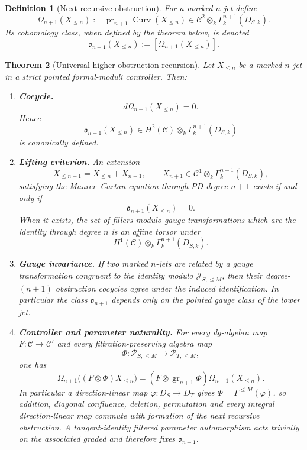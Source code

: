 \documentclass[11pt]{article}
\newtheorem{theorem}{Theorem}[section]
\newtheorem{definition}[theorem]{Definition}
\theoremstyle{remark}
\begin{document}
\begin{definition}[Next recursive obstruction]\label{P1C-def:next-recursive-obstruction}
For a marked $n$-jet define
\begin{equation}\label{P1C-eq:next-recursive-obstruction}
 \boxed{
 \Omega_{n+1}(X_{\le n})
 :=\operatorname{pr}_{n+1}\operatorname{Curv}(X_{\le n})
 \in
 \mathscr C^2\otimes_k\Gamma_k^{n+1}(D_{S,k}).}
\end{equation}
Its cohomology class, when defined by the theorem below, is denoted
\[
 \mathfrak o_{n+1}(X_{\le n})
 :=[\Omega_{n+1}(X_{\le n})].
\]
\end{definition}

\begin{theorem}[Universal higher-obstruction recursion]\label{P1C-thm:universal-higher-obstruction-recursion}
Let $X_{\le n}$ be a marked $n$-jet in a strict pointed formal-moduli controller.  Then:
\begin{enumerate}[label=\textup{(\roman*)}]
\item \textbf{Cocycle.}
\[
 \boxed{d\Omega_{n+1}(X_{\le n})=0.}
\]
Hence
\[
 \mathfrak o_{n+1}(X_{\le n})
 \in
 H^2(\mathscr C)\otimes_k\Gamma_k^{n+1}(D_{S,k})
\]
is canonically defined.

\item \textbf{Lifting criterion.}  An extension
\[
 X_{\le n+1}=X_{\le n}+X_{n+1},
 \qquad
 X_{n+1}\in\mathscr C^1\otimes_k\Gamma_k^{n+1}(D_{S,k}),
\]
satisfying the Maurer--Cartan equation through PD degree $n+1$ exists if and only if
\[
 \boxed{\mathfrak o_{n+1}(X_{\le n})=0.}
\]
When it exists, the set of fillers modulo gauge transformations which are the identity through degree $n$ is an affine torsor under
\[
 H^1(\mathscr C)\otimes_k\Gamma_k^{n+1}(D_{S,k}).
\]

\item \textbf{Gauge invariance.}  If two marked $n$-jets are related by a gauge transformation congruent to the identity modulo $\mathscr J_{S,\le M}$, then their degree-$(n+1)$ obstruction cocycles agree under the induced identification.  In particular the class $\mathfrak o_{n+1}$ depends only on the pointed gauge class of the lower jet.

\item \textbf{Controller and parameter naturality.}  For every dg-algebra map $F:\mathscr C\to\mathscr C'$ and every filtration-preserving algebra map
\[
 \Phi:\mathscr P_{S,\le M}\longrightarrow\mathscr P_{T,\le M},
\]
one has
\begin{equation}\label{P1C-eq:higher-obstruction-naturality}
 \boxed{
 \Omega_{n+1}\bigl((F\otimes\Phi)X_{\le n}\bigr)
 =
 (F\otimes\operatorname{gr}_{n+1}\Phi)
 \Omega_{n+1}(X_{\le n}).}
\end{equation}
In particular a direction-linear map $\varphi:D_S\to D_T$ gives $\Phi=\Gamma^{\le M}(\varphi)$, so addition, diagonal confluence, deletion, permutation and every integral direction-linear map commute with formation of the next recursive obstruction.  A tangent-identity filtered parameter automorphism acts trivially on the associated graded and therefore fixes $\mathfrak o_{n+1}$.
\end{enumerate}
\end{theorem}
\end{document}
